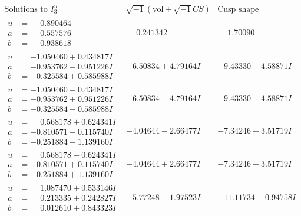 \documentclass[1p]{elsarticle_modified}
\theoremstyle{definition}
\newcommand{\I}{\sqrt{-1}}
\begin{document}
$$\begin{array}{c|c|c}  
\text{Solutions to }I^u_{3}& \I (\text{vol} + \sqrt{-1}CS) & \text{Cusp shape}\\
 \hline 
\begin{aligned}
u &= \phantom{-}0.890464\phantom{ +0.000000I} \\
a &= \phantom{-}0.557576\phantom{ +0.000000I} \\
b &= \phantom{-}0.938618\phantom{ +0.000000I}\end{aligned}
 & \phantom{-}0.241342\phantom{ +0.000000I} & \phantom{-}1.70090\phantom{ +0.000000I} \\ \hline\begin{aligned}
u &= -1.050460 + 0.434817 I \\
a &= -0.953762 - 0.951226 I \\
b &= -0.325584 + 0.585988 I\end{aligned}
 & -6.50834 + 4.79164 I & -9.43330 - 4.58871 I \\ \hline\begin{aligned}
u &= -1.050460 - 0.434817 I \\
a &= -0.953762 + 0.951226 I \\
b &= -0.325584 - 0.585988 I\end{aligned}
 & -6.50834 - 4.79164 I & -9.43330 + 4.58871 I \\ \hline\begin{aligned}
u &= \phantom{-}0.568178 + 0.624341 I \\
a &= -0.810571 - 0.115740 I \\
b &= -0.251884 - 1.139160 I\end{aligned}
 & -4.04644 - 2.66477 I & -7.34246 + 3.51719 I \\ \hline\begin{aligned}
u &= \phantom{-}0.568178 - 0.624341 I \\
a &= -0.810571 + 0.115740 I \\
b &= -0.251884 + 1.139160 I\end{aligned}
 & -4.04644 + 2.66477 I & -7.34246 - 3.51719 I \\ \hline\begin{aligned}
u &= \phantom{-}1.087470 + 0.533146 I \\
a &= \phantom{-}0.213335 + 0.242827 I \\
b &= \phantom{-}0.012610 + 0.843323 I\end{aligned}
 & -5.77248 - 1.97523 I & -11.11734 + 0.94758 I \\ \hline\begin{aligned}

\end{aligned}
\end{array}$$
\end{document}
